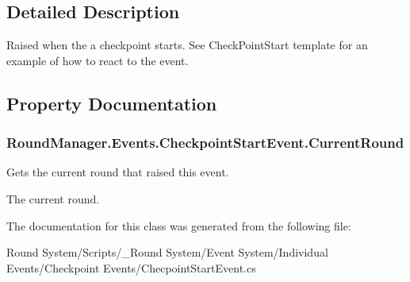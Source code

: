 \subsection{Detailed Description}
Raised when the a checkpoint starts. See Check\+Point\+Start template for an example of how to react to the event. 



\subsection{Property Documentation}
\hypertarget{class_round_manager_1_1_events_1_1_checkpoint_start_event_aef6965be346eb340a052b5cea470a041}{}
\subsubsection[{Current\+Round}]{ Round\+Manager.\+Events.\+Checkpoint\+Start\+Event.\+Current\+Round\hspace{0.3cm}{\ttfamily [get]}}\label{class_round_manager_1_1_events_1_1_checkpoint_start_event_aef6965be346eb340a052b5cea470a041}


Gets the current round that raised this event. 

The current round.

The documentation for this class was generated from the following file\+:\begin{DoxyCompactItemize}
\item 
Round System/\+Scripts/\+\_\+\+Round System/\+Event System/\+Individual Events/\+Checkpoint Events/Checpoint\+Start\+Event.\+cs\end{DoxyCompactItemize}
